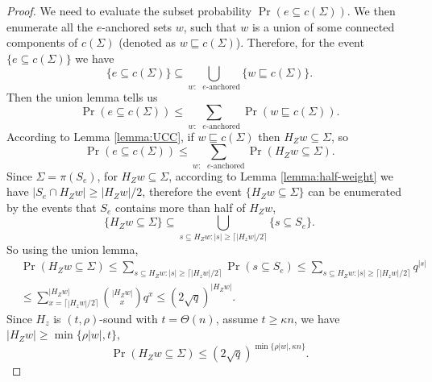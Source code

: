 \documentclass[twoside,english,aps,showpacs,pra,superscriptaddress]{revtex4-2}
\begin{document}
\begin{proof}
    We need to evaluate the subset probability $\Pr(e \subseteq c(\Sigma))$. We then enumerate all the $e$-anchored sets $w$, such that $w$ is a union of some connected components of $c(\Sigma)$ (denoted as $w \sqsubseteq c(\Sigma)$). Therefore, for the event $\{e \subseteq c(\Sigma)\}$ we have
    \begin{equation}
        \{e \subseteq c(\Sigma)\} \subseteq \bigcup_{w: \text{ $e$-anchored}} \{w \sqsubseteq c(\Sigma)\}.
    \end{equation}
    Then the union lemma tells us
    \begin{equation}
        \Pr(e \subseteq c(\Sigma)) \leq \sum_{w: \text{ $e$-anchored}} \Pr(w \sqsubseteq c(\Sigma)).
    \end{equation}
    According to Lemma \ref{lemma:UCC}, if $w \sqsubseteq c(\Sigma)$ then $H_Z w \subseteq \Sigma$, so 
    \begin{equation}
        \Pr(e \subseteq c(\Sigma)) \leq \sum_{w: \text{ $e$-anchored}} \Pr(H_Z w \subseteq \Sigma).
    \end{equation}
    Since $\Sigma = \pi(S_e)$, for $H_Z w\subseteq \Sigma$, according to Lemma \ref{lemma:half-weight} we have $|S_e \cap H_Z w| \geq |H_Z w |/2$, therefore the event $\{H_Z w \subseteq \Sigma\}$ can be enumerated by the events that $S_e$ contains more than half of $H_Z w$,
    \begin{equation}
        \{H_Z w \subseteq \Sigma\} \subseteq \bigcup_{s \subseteq H_Z w: |s| \geq \lceil |H_z w |/2\rceil} \{s \subseteq S_e\}.
    \end{equation}
    So using the union lemma,
    \begin{equation}
    \begin{aligned}
        &        \Pr(H_Z w \subseteq \Sigma) \leq \sum_{s \subseteq H_Z w: |s| \geq \lceil |H_z w |/2\rceil} \Pr(s \subseteq S_e) \leq \sum_{s \subseteq H_Z w: |s| \geq \lceil |H_z w |/2\rceil} q^{|s|}\\
        & \leq \sum_{x = \lceil |H_z w |/2\rceil}^{|H_Z w|} \binom{|H_Zw|}{x} q^x \leq (2\sqrt{q})^{|H_Z w|}.
    \end{aligned}
    \end{equation}
    Since $H_z$ is $(t,\rho)$-sound with $t=\Theta(n)$, assume $t \geq \kappa n$,
    we have $|H_Z w| \geq \min \{\rho |w|, t \}$,
    \begin{equation}
        \Pr(H_Z w \subseteq \Sigma) \leq (2\sqrt{q})^{\min\{\rho|w|, \kappa n\}}.
    \end{equation}

\end{proof}
\end{document}
